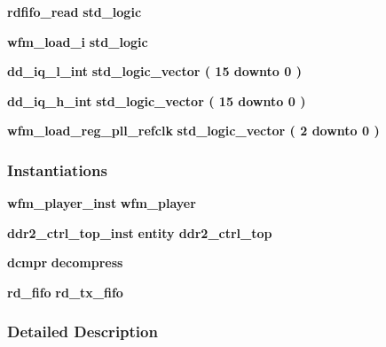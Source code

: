 \begin{DoxyCompactItemize}
\item 
{\bf rdfifo\+\_\+read} {\bfseries \textcolor{comment}{std\+\_\+logic}\textcolor{vhdlchar}{ }} 
\item 
{\bf wfm\+\_\+load\+\_\+i} {\bfseries \textcolor{comment}{std\+\_\+logic}\textcolor{vhdlchar}{ }} 
\item 
{\bf dd\+\_\+iq\+\_\+l\+\_\+int} {\bfseries \textcolor{comment}{std\+\_\+logic\+\_\+vector}\textcolor{vhdlchar}{ }\textcolor{vhdlchar}{(}\textcolor{vhdlchar}{ }\textcolor{vhdlchar}{ } \textcolor{vhdldigit}{15} \textcolor{vhdlchar}{ }\textcolor{keywordflow}{downto}\textcolor{vhdlchar}{ }\textcolor{vhdlchar}{ } \textcolor{vhdldigit}{0} \textcolor{vhdlchar}{ }\textcolor{vhdlchar}{)}\textcolor{vhdlchar}{ }} 
\item 
{\bf dd\+\_\+iq\+\_\+h\+\_\+int} {\bfseries \textcolor{comment}{std\+\_\+logic\+\_\+vector}\textcolor{vhdlchar}{ }\textcolor{vhdlchar}{(}\textcolor{vhdlchar}{ }\textcolor{vhdlchar}{ } \textcolor{vhdldigit}{15} \textcolor{vhdlchar}{ }\textcolor{keywordflow}{downto}\textcolor{vhdlchar}{ }\textcolor{vhdlchar}{ } \textcolor{vhdldigit}{0} \textcolor{vhdlchar}{ }\textcolor{vhdlchar}{)}\textcolor{vhdlchar}{ }} 
\item 
{\bf wfm\+\_\+load\+\_\+reg\+\_\+pll\+\_\+refclk} {\bfseries \textcolor{comment}{std\+\_\+logic\+\_\+vector}\textcolor{vhdlchar}{ }\textcolor{vhdlchar}{(}\textcolor{vhdlchar}{ }\textcolor{vhdlchar}{ } \textcolor{vhdldigit}{2} \textcolor{vhdlchar}{ }\textcolor{keywordflow}{downto}\textcolor{vhdlchar}{ }\textcolor{vhdlchar}{ } \textcolor{vhdldigit}{0} \textcolor{vhdlchar}{ }\textcolor{vhdlchar}{)}\textcolor{vhdlchar}{ }} 
\end{DoxyCompactItemize}
\subsubsection*{Instantiations}
 \begin{DoxyCompactItemize}
\item 
{\bf wfm\+\_\+player\+\_\+inst}  {\bfseries wfm\+\_\+player}   
\item 
{\bf ddr2\+\_\+ctrl\+\_\+top\+\_\+inst}  {\bfseries entity ddr2\+\_\+ctrl\+\_\+top}   
\item 
{\bf dcmpr}  {\bfseries decompress}   
\item 
{\bf rd\+\_\+fifo}  {\bfseries rd\+\_\+tx\+\_\+fifo}   
\end{DoxyCompactItemize}


\subsubsection{Detailed Description}


